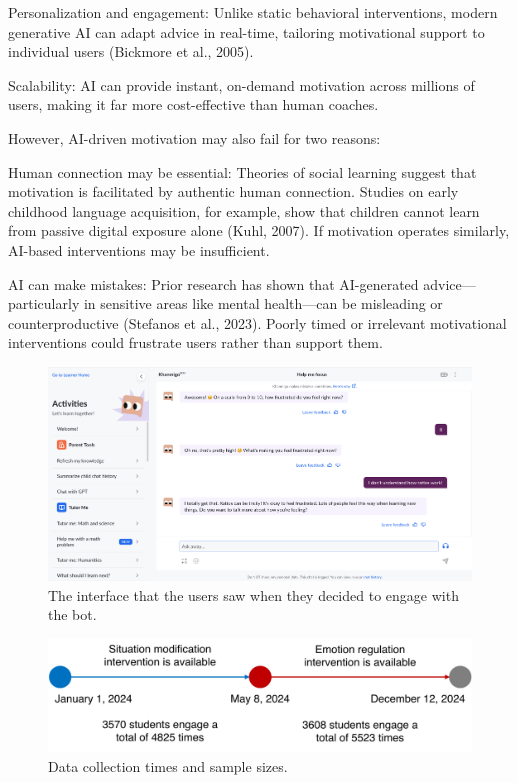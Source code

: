 \documentclass[11pt]{report}
\begin{document}
\begin{mainf}
Personalization and engagement: Unlike static behavioral interventions, modern generative AI can adapt advice in real-time, tailoring motivational support to individual users (Bickmore et al., 2005).

Scalability: AI can provide instant, on-demand motivation across millions of users, making it far more cost-effective than human coaches.

However, AI-driven motivation may also fail for two reasons:

Human connection may be essential: Theories of social learning suggest that motivation is facilitated by authentic human connection. 
Studies on early childhood language acquisition, for example, show that children cannot learn from passive digital exposure alone (Kuhl, 2007). 
If motivation operates similarly, AI-based interventions may be insufficient.

AI can make mistakes: Prior research has shown that AI-generated advice—particularly in sensitive areas like mental health—can be misleading or counterproductive (Stefanos et al., 2023). 
Poorly timed or irrelevant motivational interventions could frustrate users rather than support them.

\begin{figure}
    \centering
    \includegraphics[width=0.95\linewidth]{interface.png}
    \caption{The interface that the users saw when they decided to engage with the bot.}
    \label{fig:interface}
\end{figure}

\begin{figure}
    \centering
    \includegraphics[width=0.95\linewidth]{sample.pdf}
    \caption{Data collection times and sample sizes.}
    \label{fig:sample}
\end{figure}



\end{mainf}
\end{document}
